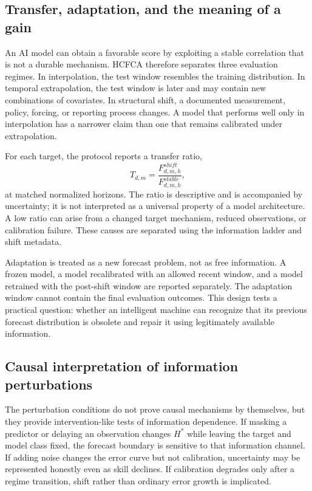 \documentclass[conference]{IEEEtran}
\begin{document}
\subsection{Transfer, adaptation, and the meaning of a gain}
An AI model can obtain a favorable score by exploiting a stable correlation that is not a durable mechanism. HCFCA therefore separates three evaluation regimes. In interpolation, the test window resembles the training distribution. In temporal extrapolation, the test window is later and may contain new combinations of covariates. In structural shift, a documented measurement, policy, forcing, or reporting process changes. A model that performs well only in interpolation has a narrower claim than one that remains calibrated under extrapolation.

For each target, the protocol reports a transfer ratio,
\begin{equation}
 T_{d,m}=\frac{F_{d,m,h}^{shift}}{F_{d,m,h}^{stable}},
\end{equation}
at matched normalized horizons. The ratio is descriptive and is accompanied by uncertainty; it is not interpreted as a universal property of a model architecture. A low ratio can arise from a changed target mechanism, reduced observations, or calibration failure. These causes are separated using the information ladder and shift metadata.

Adaptation is treated as a new forecast problem, not as free information. A frozen model, a model recalibrated with an allowed recent window, and a model retrained with the post-shift window are reported separately. The adaptation window cannot contain the final evaluation outcomes. This design tests a practical question: whether an intelligent machine can recognize that its previous forecast distribution is obsolete and repair it using legitimately available information.

\subsection{Causal interpretation of information perturbations}
The perturbation conditions do not prove causal mechanisms by themselves, but they provide intervention-like tests of information dependence. If masking a predictor or delaying an observation changes $H^*$ while leaving the target and model class fixed, the forecast boundary is sensitive to that information channel. If adding noise changes the error curve but not calibration, uncertainty may be represented honestly even as skill declines. If calibration degrades only after a regime transition, shift rather than ordinary error growth is implicated.
\end{document}
